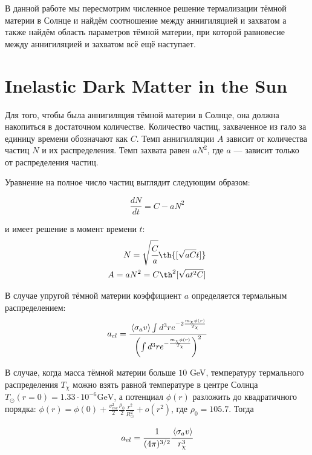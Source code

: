 \documentclass[a4paper, 14pt]{article}
\newcommand{\tderiv}[1]{\frac{d #1}{d t}}
\newcommand{\avarage}[1]{\left\langle #1 \right\rangle}
\begin{document}
В данной работе мы пересмотрим численное решение термализации тёмной материи в Солнце и найдём соотношение между аннигиляцией и захватом а также найдём область параметров тёмной материи, при которой равновесие между аннигиляцией и захватом всё ещё наступает.
	
	\section{Inelastic Dark Matter in the Sun}
	Для того, чтобы была аннигиляция тёмной материи в Солнце, она должна накопиться в достаточном количестве. Количество частиц, захваченное из гало за единицу времени обозначают как $C$. Темп аннигилляции $A$ зависит от количества частиц $N$ и их распределения. Темп захвата равен $aN^2$, где $a$ --- зависит только от распределения частиц. 

Уравнение на полное число частиц выглядит следующим образом:

\begin{equation}
	\tderiv{N} = C - aN^2
\end{equation}

\noindent и имеет решение в момент времени $t$:
\begin{equation}
\begin{split}
	N = \sqrt{\cfrac{C}{a}} \th{[\sqrt{aC}t]} \\
	A = aN^2 = C \th^2{[\sqrt{at^2C}]}
	\label{eq:AnnNtherm}
\end{split}
\end{equation}
	

В случае упругой тёмной материи коэффициент $a$ определяется термальным распределением:
\begin{equation}
	a_{el} = \cfrac{
		\avarage{\sigma_{a}v} \int{d^3 r e^{-2 \frac{m_{\chi}\phi(r)}{T_{\chi}} }}
	}{\left(
		\int{d^3 r e^{- \frac{m_{\chi}\phi(r)}{T_{\chi}} }}
	\right)^2}
\end{equation}

В случае, когда масса тёмной материи больше $10$ GeV, температуру термального распределения $T_{\chi}$ можно взять равной температуре в центре Солнца $T_{\odot}(r=0) = 1.33\cdot10^{-6} \text{GeV}$, а потенциал $\phi(r)$ разложить до квадратичного порядка: $\phi(r) =\phi(0)+ \frac{v_{esc}^2}{2} \frac{\rho_0}{2} \frac{r^2}{R_{\odot}^2} + o(r^2)$,  где $\rho_0 = 105.7$. Тогда

\begin{equation}
	a_{el} = \cfrac{1}{(4\pi)^{3/2}} \cfrac{\avarage{\sigma_{a}v}}{ r_{\chi}^3 }
\end{equation}
\end{document}

